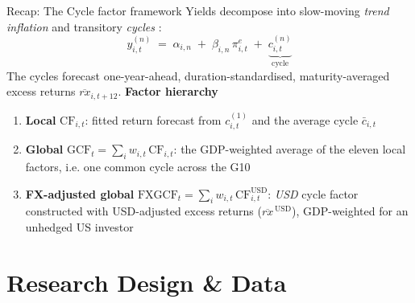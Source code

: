 \documentclass[10pt]{beamer}
\newcommand{\CF}{\mathrm{CF}}
\newcommand{\GCF}{\mathrm{GCF}}
\newcommand{\FXGCF}{\mathrm{FXGCF}}
\newcommand{\rxbar}{\overline{rx}}
\begin{document}
\begin{frame}{Recap: The Cycle factor framework}
  Yields decompose into slow-moving \emph{trend inflation} and transitory
  \emph{cycles} \citep{cieslak2015}:
  \begin{equation*}
    y^{(n)}_{i,t} \;=\; \alpha_{i,n} \;+\; \beta_{i,n}\,\pi^{e}_{i,t}
      \;+\; \underbrace{c^{(n)}_{i,t}}_{\text{cycle}}
  \end{equation*}
  The cycles forecast one-year-ahead, duration-standardised,
  maturity-averaged excess returns $\rxbar_{i,t+12}$.
  \vfill
  \textbf{Factor hierarchy}
  \begin{enumerate}
    \item \textbf{Local} $\CF_{i,t}$: fitted return forecast from
      $c^{(1)}_{i,t}$ and the average cycle $\bar c_{i,t}$
    \item \textbf{Global} $\GCF_{t} = \sum_{i} w_{i,t}\,\CF_{i,t}$:
      the GDP-weighted average of the eleven local factors, i.e. one common cycle
      across the G10 \citep{dahlquist2013}
    \item \textbf{FX-adjusted global}
      $\FXGCF_{t} = \sum_{i} w_{i,t}\,\CF^{\mathrm{USD}}_{i,t}$: \emph{USD} cycle factor constructed with USD-adjusted excess returns ($\rxbar^{\,\mathrm{USD}}$),
      GDP-weighted for an unhedged US investor
  \end{enumerate}
\end{frame}

\section{Research Design \& Data}
\end{document}
